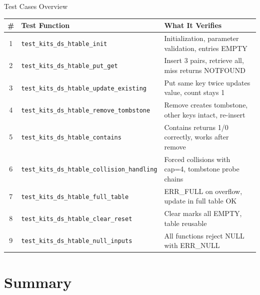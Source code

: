 \documentclass[aspectratio=169, 10pt]{beamer}
\begin{document}
\begin{frame}{Test Cases Overview}
\begin{table}
\centering
\small
\begin{tabular}{@{}clp{7cm}@{}}
\toprule
\textbf{\#} & \textbf{Test Function} & \textbf{What It Verifies} \\
\midrule
1 & \texttt{test\_kits\_ds\_htable\_init}
  & Initialization, parameter validation, entries EMPTY \\
2 & \texttt{test\_kits\_ds\_htable\_put\_get}
  & Insert 3 pairs, retrieve all, miss returns NOTFOUND \\
3 & \texttt{test\_kits\_ds\_htable\_update\_existing}
  & Put same key twice updates value, count stays 1 \\
4 & \texttt{test\_kits\_ds\_htable\_remove\_tombstone}
  & Remove creates tombstone, other keys intact, re-insert \\
5 & \texttt{test\_kits\_ds\_htable\_contains}
  & Contains returns 1/0 correctly, works after remove \\
6 & \texttt{test\_kits\_ds\_htable\_collision\_handling}
  & Forced collisions with cap=4, tombstone probe chains \\
7 & \texttt{test\_kits\_ds\_htable\_full\_table}
  & ERR\_FULL on overflow, update in full table OK \\
8 & \texttt{test\_kits\_ds\_htable\_clear\_reset}
  & Clear marks all EMPTY, table reusable \\
9 & \texttt{test\_kits\_ds\_htable\_null\_inputs}
  & All functions reject NULL with ERR\_NULL \\
\bottomrule
\end{tabular}
\end{table}
\end{frame}

\section{Summary}
\end{document}
